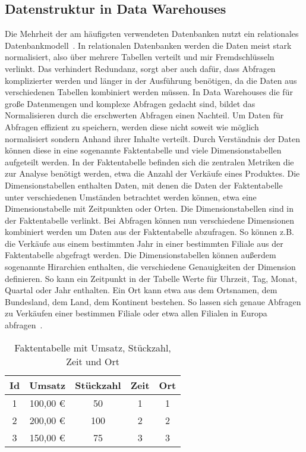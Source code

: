\subsection{Datenstruktur in Data Warehouses}
Die Mehrheit der am häufigsten verwendeten Datenbanken nutzt ein relationales Datenbankmodell~\cite{db-engines_most_2023}. 
In relationalen Datenbanken werden die Daten meist stark normalisiert, also über mehrere Tabellen verteilt und mir Fremdschlüsseln verlinkt. 
Das verhindert Redundanz, sorgt aber auch dafür, dass Abfragen komplizierter werden und länger in der Ausführung benötigen, da die Daten aus verschiedenen Tabellen kombiniert werden müssen.
In Data Warehouses die für große Datenmengen und komplexe Abfragen gedacht sind, bildet das Normalisieren durch die erschwerten Abfragen einen Nachteil.
Um Daten für Abfragen effizient zu speichern, werden diese nicht soweit wie möglich normalisiert sondern Anhand ihrer Inhalte verteilt. Durch Verständnis der Daten können diese in eine sogenannte Faktentabelle und viele Dimensionstabellen aufgeteilt werden. In der Faktentabelle befinden sich die zentralen Metriken die zur Analyse benötigt werden, etwa die Anzahl der Verkäufe eines Produktes. Die Dimensionstabellen enthalten Daten, mit denen die Daten der Faktentabelle unter verschiedenen Umständen betrachtet werden können, etwa eine Dimensionstabelle mit Zeitpunkten oder Orten. Die Dimensionstabellen sind in der Faktentabelle verlinkt. Bei Abfragen können nun verschiedene Dimensionen kombiniert werden um Daten aus der Faktentabelle abzufragen. So können z.B. die Verkäufe aus einem bestimmten Jahr in einer bestimmten Filiale aus der Faktentabelle abgefragt werden.
Die Dimensionstabellen können außerdem sogenannte Hirarchien enthalten, die verschiedene Genauigkeiten der Dimension definieren.
So kann ein Zeitpunkt in der Tabelle Werte für Uhrzeit, Tag, Monat, Quartal oder Jahr enthalten. Ein Ort kann etwa aus dem Ortsnamen, dem Bundesland, dem Land, dem Kontinent bestehen. So lassen sich genaue Abfragen zu Verkäufen einer bestimmen Filiale oder etwa allen Filialen in Europa abfragen~\cite[s. 5]{vaisman_data_2022}.

\begin{table}[ht] 
    \centering
    \footnotesize
    \begin{tabular}{ccccc}
        \toprule  
        Id & Umsatz & Stückzahl & Zeit & Ort \\
        \midrule
        1 & 100,00 € & 50 & 1 & 1 \\
        2 & 200,00 € & 100 & 2 & 2 \\
        3 & 150,00 € & 75 & 3 & 3 \\
        \bottomrule
    \end{tabular}
    \caption{Faktentabelle mit Umsatz, Stückzahl, Zeit und Ort}
    \label{tab:faktentabelle}
\end{table}

